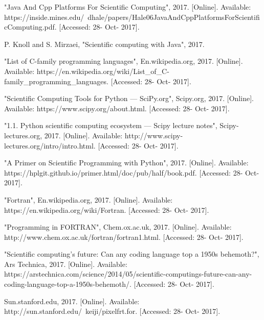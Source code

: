\documentclass[conference]{IEEEtran}
\begin{document}
\begin{thebibliography}{00}
 "Java And Cpp Platforms For Scientific Computing", 2017. [Online]. Available: https://inside.mines.edu/~dhale/papers/Hale06JavaAndCppPlatformsForScientificComputing.pdf. [Accessed: 28- Oct- 2017].

 P. Knoll and S. Mirzaei, "Scientific computing with Java", 2017.

 "List of C-family programming languages", En.wikipedia.org, 2017. [Online]. Available: https://en.wikipedia.org/wiki/List\_of\_C-family\_programming\_languages. [Accessed: 28- Oct- 2017].

 "Scientific Computing Tools for Python — SciPy.org", Scipy.org, 2017. [Online]. Available: https://www.scipy.org/about.html. [Accessed: 28- Oct- 2017].

 "1.1. Python scientific computing ecosystem — Scipy lecture notes", Scipy-lectures.org, 2017. [Online]. Available: http://www.scipy-lectures.org/intro/intro.html. [Accessed: 28- Oct- 2017].

 "A Primer on Scientific Programming with Python", 2017. [Online]. Available: https://hplgit.github.io/primer.html/doc/pub/half/book.pdf. [Accessed: 28- Oct- 2017].

 "Fortran", En.wikipedia.org, 2017. [Online]. Available: https://en.wikipedia.org/wiki/Fortran. [Accessed: 28- Oct- 2017].

 "Programming in FORTRAN", Chem.ox.ac.uk, 2017. [Online]. Available: http://www.chem.ox.ac.uk/fortran/fortran1.html. [Accessed: 28- Oct- 2017].

 "Scientific computing’s future: Can any coding language top a 1950s behemoth?", Ars Technica, 2017. [Online]. Available: https://arstechnica.com/science/2014/05/scientific-computings-future-can-any-coding-language-top-a-1950s-behemoth/. [Accessed: 28- Oct- 2017].

 Sun.stanford.edu, 2017. [Online]. Available: http://sun.stanford.edu/~keiji/pixelfrt.for. [Accessed: 28- Oct- 2017].

\end{thebibliography}
\end{document}
